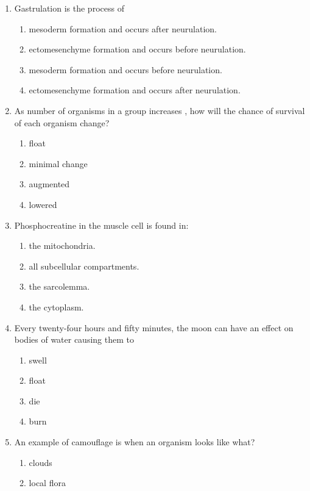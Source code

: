 \documentclass[12pt]{article}
\begin{document}
\begin{enumerate}[label=\arabic*.]
\begin{enumerate}[label=(\alph*)]
    \item A human embryo displays features of adult fish and birds in the course of its development.
\end{enumerate}
\item Gastrulation is the process of
\begin{enumerate}[label=(\alph*)]
    \item mesoderm formation and occurs after neurulation.
    \item ectomesenchyme formation and occurs before neurulation.
    \item mesoderm formation and occurs before neurulation.
    \item ectomesenchyme formation and occurs after neurulation.
\end{enumerate}
\item As number of organisms in a group increases , how will the chance of survival of each organism change?
\begin{enumerate}[label=(\alph*)]
    \item float
    \item minimal change
    \item augmented
    \item lowered
\end{enumerate}
\item Phosphocreatine in the muscle cell is found in:
\begin{enumerate}[label=(\alph*)]
    \item the mitochondria.
    \item all subcellular compartments.
    \item the sarcolemma.
    \item the cytoplasm.
\end{enumerate}
\item Every twenty-four hours and fifty minutes, the moon can have an effect on bodies of water causing them to
\begin{enumerate}[label=(\alph*)]
    \item swell
    \item float
    \item die
    \item burn
\end{enumerate}
\item An example of camouflage is when an organism looks like what?
\begin{enumerate}[label=(\alph*)]
    \item clouds
    \item local flora

\end{enumerate}
\end{enumerate}
\end{document}

